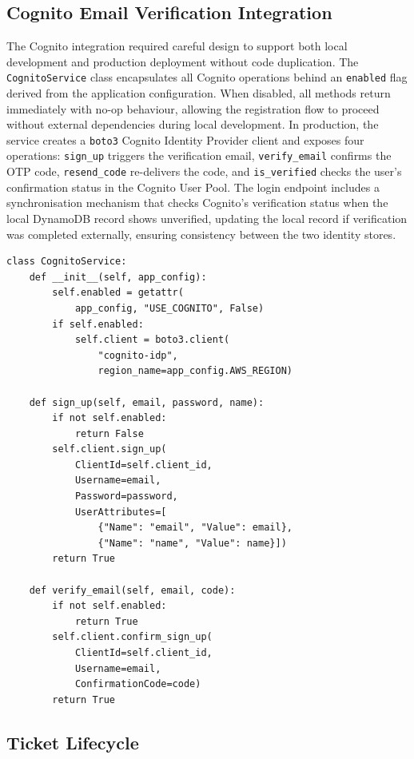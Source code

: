 \documentclass[conference]{IEEEtran}
\begin{document}
\subsection{Cognito Email Verification Integration}

The Cognito integration required careful design to support both local development and production deployment without code duplication. The \texttt{CognitoService} class encapsulates all Cognito operations behind an \texttt{enabled} flag derived from the application configuration. When disabled, all methods return immediately with no-op behaviour, allowing the registration flow to proceed without external dependencies during local development. In production, the service creates a \texttt{boto3} Cognito Identity Provider client and exposes four operations: \texttt{sign\_up} triggers the verification email, \texttt{verify\_email} confirms the OTP code, \texttt{resend\_code} re-delivers the code, and \texttt{is\_verified} checks the user's confirmation status in the Cognito User Pool. The login endpoint includes a synchronisation mechanism that checks Cognito's verification status when the local DynamoDB record shows unverified, updating the local record if verification was completed externally, ensuring consistency between the two identity stores.

\begin{lstlisting}[caption={Cognito service with environment-aware toggling.}, label={lst:cognito}]
class CognitoService:
    def __init__(self, app_config):
        self.enabled = getattr(
            app_config, "USE_COGNITO", False)
        if self.enabled:
            self.client = boto3.client(
                "cognito-idp",
                region_name=app_config.AWS_REGION)

    def sign_up(self, email, password, name):
        if not self.enabled:
            return False
        self.client.sign_up(
            ClientId=self.client_id,
            Username=email,
            Password=password,
            UserAttributes=[
                {"Name": "email", "Value": email},
                {"Name": "name", "Value": name}])
        return True

    def verify_email(self, email, code):
        if not self.enabled:
            return True
        self.client.confirm_sign_up(
            ClientId=self.client_id,
            Username=email,
            ConfirmationCode=code)
        return True
\end{lstlisting}

\subsection{Ticket Lifecycle}
\end{document}
